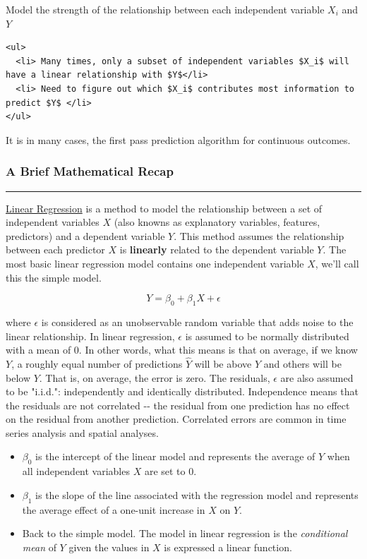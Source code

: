 \documentclass[11pt]{article}
\begin{document}
Model the strength of the relationship between each independent variable
\(X_i\) and \(Y\)

\begin{verbatim}
<ul>
  <li> Many times, only a subset of independent variables $X_i$ will have a linear relationship with $Y$</li>
  <li> Need to figure out which $X_i$ contributes most information to predict $Y$ </li>
</ul>
\end{verbatim}

It is in many cases, the first pass prediction algorithm for continuous
outcomes.

\subsubsection{A Brief Mathematical
Recap}\label{a-brief-mathematical-recap}

\begin{center}\rule{0.5\linewidth}{\linethickness}\end{center}

\href{http://en.wikipedia.org/wiki/Linear_regression}{Linear Regression}
is a method to model the relationship between a set of independent
variables \(X\) (also knowns as explanatory variables, features,
predictors) and a dependent variable \(Y\). This method assumes the
relationship between each predictor \(X\) is \textbf{linearly} related
to the dependent variable \(Y\). The most basic linear regression model
contains one independent variable \(X\), we'll call this the simple
model.

\[ Y = \beta_0 + \beta_1 X + \epsilon\]

where \(\epsilon\) is considered as an unobservable random variable that
adds noise to the linear relationship. In linear regression,
\(\epsilon\) is assumed to be normally distributed with a mean of 0. In
other words, what this means is that on average, if we know \(Y\), a
roughly equal number of predictions \(\hat{Y}\) will be above \(Y\) and
others will be below \(Y\). That is, on average, the error is zero. The
residuals, \(\epsilon\) are also assumed to be "i.i.d.": independently
and identically distributed. Independence means that the residuals are
not correlated -\/- the residual from one prediction has no effect on
the residual from another prediction. Correlated errors are common in
time series analysis and spatial analyses.

\begin{itemize}
\item
  \(\beta_0\) is the intercept of the linear model and represents the
  average of \(Y\) when all independent variables \(X\) are set to 0.
\item
  \(\beta_1\) is the slope of the line associated with the regression
  model and represents the average effect of a one-unit increase in
  \(X\) on \(Y\).
\item
  Back to the simple model. The model in linear regression is the
  \emph{conditional mean} of \(Y\) given the values in \(X\) is
  expressed a linear function.
\end{itemize}
\end{document}
